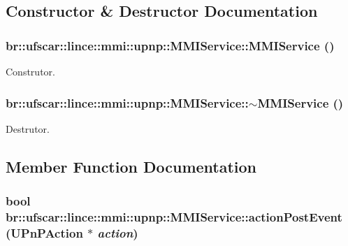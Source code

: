 \subsection{Constructor \& Destructor Documentation}
\hypertarget{classbr_1_1ufscar_1_1lince_1_1mmi_1_1upnp_1_1MMIService_a02cbbb28a8831c5c5d535fc76111eb96}{
\subsubsection[{MMIService}]{\setlength{\rightskip}{0pt plus 5cm}br::ufscar::lince::mmi::upnp::MMIService::MMIService ()}}
\label{classbr_1_1ufscar_1_1lince_1_1mmi_1_1upnp_1_1MMIService_a02cbbb28a8831c5c5d535fc76111eb96}


Construtor. 

\hypertarget{classbr_1_1ufscar_1_1lince_1_1mmi_1_1upnp_1_1MMIService_a549825fd03af5db240df7435e66fe9fb}{
\subsubsection[{$\sim$MMIService}]{\setlength{\rightskip}{0pt plus 5cm}br::ufscar::lince::mmi::upnp::MMIService::$\sim$MMIService ()}}
\label{classbr_1_1ufscar_1_1lince_1_1mmi_1_1upnp_1_1MMIService_a549825fd03af5db240df7435e66fe9fb}


Destrutor. 



\subsection{Member Function Documentation}
\hypertarget{classbr_1_1ufscar_1_1lince_1_1mmi_1_1upnp_1_1MMIService_abd5a9ef1a311388d61cfe7c1a8380f56}{
\subsubsection[{actionPostEvent}]{\setlength{\rightskip}{0pt plus 5cm}bool br::ufscar::lince::mmi::upnp::MMIService::actionPostEvent (UPnPAction $\ast$ {\em action})}}
\label{classbr_1_1ufscar_1_1lince_1_1mmi_1_1upnp_1_1MMIService_abd5a9ef1a311388d61cfe7c1a8380f56}


